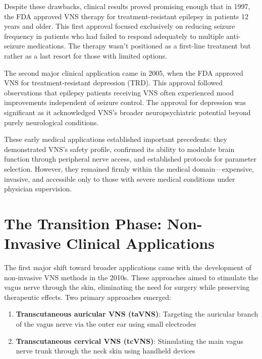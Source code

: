 \documentclass[
  Letterpaper,
]{scrbook}
\providecommand{\tightlist}{%
  \setlength{\itemsep}{0pt}\setlength{\parskip}{0pt}}\usepackage{longtable,booktabs,array}
\begin{document}
Despite these drawbacks, clinical results proved promising enough that
in 1997, the FDA approved VNS therapy for treatment-resistant epilepsy
in patients 12 years and older. This first approval focused exclusively
on reducing seizure frequency in patients who had failed to respond
adequately to multiple anti-seizure medications. The therapy wasn't
positioned as a first-line treatment but rather as a last resort for
those with limited options.

The second major clinical application came in 2005, when the FDA
approved VNS for treatment-resistant depression (TRD). This approval
followed observations that epilepsy patients receiving VNS often
experienced mood improvements independent of seizure control. The
approval for depression was significant as it acknowledged VNS's broader
neuropsychiatric potential beyond purely neurological conditions.

These early medical applications established important precedents: they
demonstrated VNS's safety profile, confirmed its ability to modulate
brain function through peripheral nerve access, and established
protocols for parameter selection. However, they remained firmly within
the medical domain---expensive, invasive, and accessible only to those
with severe medical conditions under physician supervision.

\section{The Transition Phase: Non-Invasive Clinical
Applications}\label{the-transition-phase-non-invasive-clinical-applications}

The first major shift toward broader applications came with the
development of non-invasive VNS methods in the 2010s. These approaches
aimed to stimulate the vagus nerve through the skin, eliminating the
need for surgery while preserving therapeutic effects. Two primary
approaches emerged:

\begin{enumerate}
\def\labelenumi{\arabic{enumi}.}
\tightlist
\item
  \textbf{Transcutaneous auricular VNS (taVNS)}: Targeting the auricular
  branch of the vagus nerve via the outer ear using small electrodes
\item
  \textbf{Transcutaneous cervical VNS (tcVNS)}: Stimulating the main
  vagus nerve trunk through the neck skin using handheld devices
\end{enumerate}
\end{document}
